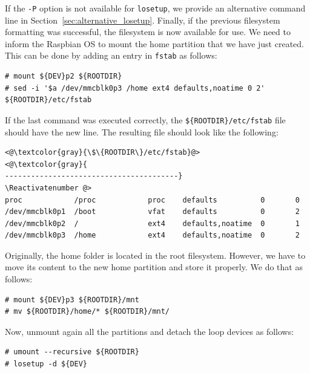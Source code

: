 \documentclass[electronics,article,accept,moreauthors,pdftex,10pt,a4paper]{mdpi}
\theoremstyle{mdpi}
\newcounter{ex}
\newcounter{re}
\theoremstyle{mdpidefinition}
\begin{document}
If the \texttt{-P} option is not available for
\texttt{losetup}, we provide an alternative command line in
Section~\ref{sec:alternative_losetup}. Finally, if the previous filesystem
formatting was successful, the filesystem is now available for use.
We need to inform the Raspbian OS to mount the home partition
that we have just created.
This can be done by adding
an entry in \texttt{fstab} as follows:

\begin{lstlisting}[]
# mount ${DEV}p2 ${ROOTDIR}
# sed -i '$a /dev/mmcblk0p3 /home ext4 defaults,noatime 0 2' ${ROOTDIR}/etc/fstab
\end{lstlisting}
\FloatBarrier
\vspace{-5mm}

If the last command was executed correctly, the
\texttt{\$\{ROOTDIR\}/etc/fstab} file should have the new line.
The resulting file should look like the following:

\begin{lstlisting}[]
<@\textcolor{gray}{\$\{ROOTDIR\}/etc/fstab}@>
<@\textcolor{gray}{
----------------------------------------}
\Reactivatenumber @>
proc            /proc            proc    defaults          0       0
/dev/mmcblk0p1  /boot            vfat    defaults          0       2
/dev/mmcblk0p2  /                ext4    defaults,noatime  0       1
/dev/mmcblk0p3  /home            ext4    defaults,noatime  0       2
\end{lstlisting}
\FloatBarrier
\vspace{-5mm}

Originally, the home folder is located in the root filesystem. However,
we have to move its content to the new home partition and store it properly.
We do that as follows:

\begin{lstlisting}[]
# mount ${DEV}p3 ${ROOTDIR}/mnt
# mv ${ROOTDIR}/home/* ${ROOTDIR}/mnt/
\end{lstlisting}
\FloatBarrier
\vspace{-5mm}

Now, unmount again all the partitions and detach the loop devices as follows:
\begin{lstlisting}[]
# umount --recursive ${ROOTDIR}
# losetup -d ${DEV}
\end{lstlisting}
\FloatBarrier
\vspace{-5mm}
\end{document}
